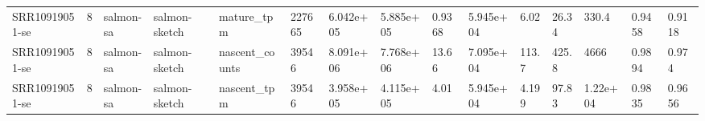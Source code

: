 \begin{tabular}{lllllllllllllll}
SRR10919051-se & 8 & salmon-sa & salmon-sketch & mature\_tpm & 227665 & 6.042e+05 & 5.885e+05 & 0.9368 & 5.945e+04 & 6.02 & 26.34 & 330.4 & 0.9458 & 0.9118 \\
SRR10919051-se & 8 & salmon-sa & salmon-sketch & nascent\_counts & 39546 & 8.091e+06 & 7.768e+06 & 13.66 & 7.095e+04 & 113.7 & 425.8 & 4666 & 0.9894 & 0.974 \\
SRR10919051-se & 8 & salmon-sa & salmon-sketch & nascent\_tpm & 39546 & 3.958e+05 & 4.115e+05 & 4.01 & 5.945e+04 & 4.199 & 97.83 & 1.22e+04 & 0.9835 & 0.9656 \\
\bottomrule
\end{tabular}
